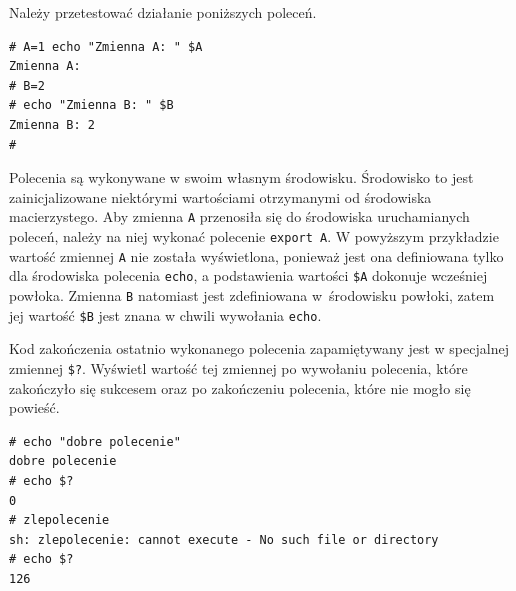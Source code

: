 \begin{example} Należy przetestować działanie poniższych poleceń. 

\begin{lstlisting}[style=MyBashStyle] 
# A=1 echo "Zmienna A: " $A
Zmienna A:
# B=2
# echo "Zmienna B: " $B
Zmienna B: 2
#
\end{lstlisting} 

Polecenia są wykonywane w swoim własnym środowisku. Środowisko to jest zainicjalizowane niektórymi wartościami otrzymanymi od środowiska macierzystego. Aby zmienna \lstinline[style=MyBashStyle]{A} przenosiła się do środowiska uruchamianych poleceń, należy na niej wykonać polecenie \lstinline[deletekeywords={export}]{export A}. W powyższym przykładzie wartość zmiennej \lstinline[style=MyBashStyle]{A} nie została wyświetlona, ponieważ jest ona definiowana tylko dla środowiska polecenia \lstinline[style=MyBashStyle]{echo}, a podstawienia wartości \lstinline[style=MyBashStyle]{$A} dokonuje wcześniej powłoka. Zmienna \lstinline[style=MyBashStyle]{B} natomiast jest zdefiniowana w~środowisku powłoki, zatem jej wartość \lstinline[style=MyBashStyle]{$B} jest znana w chwili wywołania \lstinline[style=MyBashStyle]{echo}.

\end{example} 


\begin{example} 
Kod zakończenia ostatnio wykonanego polecenia zapamiętywany jest w specjalnej zmiennej \lstinline[style=MyBashStyle]{$?}. Wyświetl wartość tej zmiennej po wywołaniu polecenia, które zakończyło się sukcesem oraz po zakończeniu polecenia, które nie mogło się powieść.

\begin{lstlisting}[style=MyBashStyle] 
# echo "dobre polecenie"
dobre polecenie
# echo $?
0
# zlepolecenie
sh: zlepolecenie: cannot execute - No such file or directory 
# echo $?
126
\end{lstlisting} 
\end{example} 


